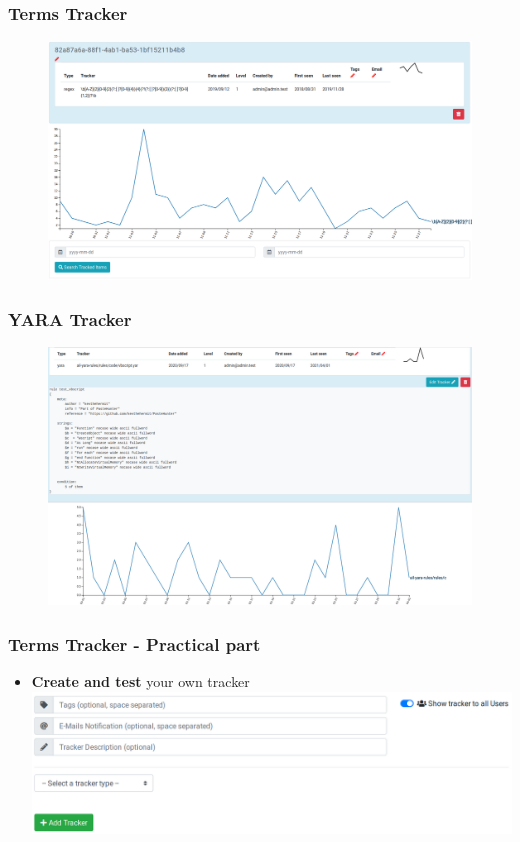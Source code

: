 \documentclass{beamer}
\begin{document}
\begin{frame}
    \frametitle{Terms Tracker}
        \begin{figure}
            \includegraphics[scale=0.22]{images/term-tracker.png}
        \end{figure}
\end{frame}

\begin{frame}
    \frametitle{YARA Tracker}
        \begin{figure}
            \includegraphics[scale=0.22]{screenshot/term-tracker-yara.png}
        \end{figure}
\end{frame}

\begin{frame}
    \frametitle{Terms Tracker - Practical part}
        \begin{itemize}
        	\item \textbf{Create and test} your own tracker
        	\includegraphics[scale=0.3]{images/term-tracker-create.png}
        \end{itemize}
\end{frame}
\end{document}
